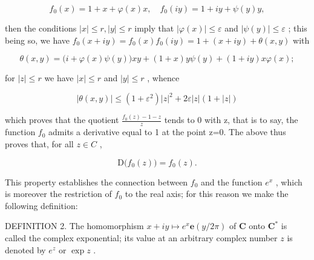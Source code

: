 \[
f _ {0} (x) = 1 + x + \varphi (x) x, \quad f _ {0} (i y) = 1 + i y + \psi (y) y,
\]

then the conditions \(|x| \leqslant r, |y| \leqslant r\) imply that \(|\varphi(x)| \leqslant \varepsilon\) and \(|\psi(y)| \leqslant \varepsilon\) ; this being so, we have \(f_0(x + iy) = f_0(x)f_0(iy) = 1 + (x + iy) + \theta(x, y)\) with

\[
\theta (x, y) = \bigl (i + \varphi (x) \psi (y) \bigr) x y + (1 + x) y \psi (y) + (1 + i y) x \varphi (x);
\]

for \(|z| \leqslant r\) we have \(|x| \leqslant r\) and \(|y| \leqslant r\) , whence

\[
\left| \theta (x, y) \right| \leqslant \left(1 + \varepsilon^ {2}\right) | z | ^ {2} + 2 \varepsilon | z | (1 + | z |)
\]

which proves that the quotient \(\frac{f_{0}(z)-1-z}{z}\) tends to 0 with z, that is to say, the function \(f_{0}\) admits a derivative equal to 1 at the point z=0. The above thus proves that, for all \(z\in C\) ,

\[
\mathrm{D} \big (f _ {0} (z) \big) = f _ {0} (z).\tag{21}
\]

This property establishes the connection between \(f_{0}\) and the function \(e^{x}\) , which is moreover the restriction of \(f_{0}\) to the real axis; for this reason we make the following definition:

DEFINITION 2. The homomorphism \(x + iy \mapsto e^x\mathbf{e}(y/2\pi)\) of \(\mathbf{C}\) onto \(\mathbf{C}^*\) is called the complex exponential; its value at an arbitrary complex number \(z\) is denoted by \(e^z\) or \(\exp z\) .

